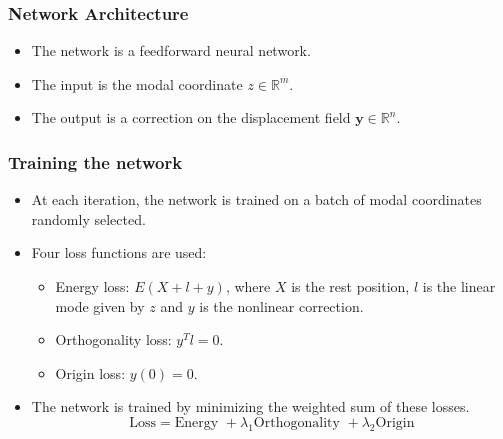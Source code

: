 \documentclass{beamer}
\begin{document}
\begin{frame}
    \frametitle{Network Architecture}
    \begin{itemize}
        \item The network is a feedforward neural network.
        \item The input is the modal coordinate \( z \in \mathbb{R}^m \).
        \item The output is a correction on the displacement field \( \mathbf{y} \in \mathbb{R}^n \).
    \end{itemize}



\begin{center}
        
\end{center}
    
\end{frame}

\begin{frame}
    \frametitle{Training the network}
    \begin{itemize}
        \item At each iteration, the network is trained on a batch of modal coordinates randomly selected.
        \item Four loss functions are used:
        \begin{itemize}
            \item Energy loss: \( E(X + l + y)\), where \(X\) is the rest position, \(l\) is the linear mode given by \(z\) and \(y\) is the nonlinear correction.
            \item Orthogonality loss: \( y^T l = 0 \).
            \item Origin loss: \( y(0) = 0 \).
        \end{itemize}
        \item The network is trained by minimizing the weighted sum of these losses.
        \[
        \text{Loss} = \text{Energy } + \lambda_1 \text{Orthogonality } + \lambda_2 \text{Origin}
        \]
    \end{itemize}
\end{frame}
\end{document}
